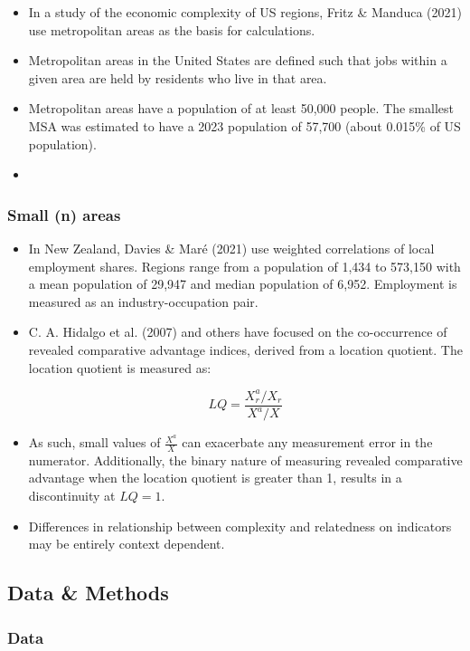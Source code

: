\documentclass[
]{agujournal2019}
\providecommand{\tightlist}{%
  \setlength{\itemsep}{0pt}\setlength{\parskip}{0pt}}\usepackage{longtable,booktabs,array}
\begin{document}
\begin{itemize}
\tightlist
\item
  In a study of the economic complexity of US regions, Fritz \& Manduca
  (2021) use metropolitan areas as the basis for calculations.
\item
  Metropolitan areas in the United States are defined such that jobs
  within a given area are held by residents who live in that area.
\item
  Metropolitan areas have a population of at least 50,000 people. The
  smallest MSA was estimated to have a 2023 population of 57,700 (about
  0.015\% of US population).
\item
\end{itemize}

\subsubsection{Small (n) areas}\label{small-n-areas}

\begin{itemize}
\item
  In New Zealand, Davies \& Maré (2021) use weighted correlations of
  local employment shares. Regions range from a population of 1,434 to
  573,150 with a mean population of 29,947 and median population of
  6,952. Employment is measured as an industry-occupation pair.
\item
  C. A. Hidalgo et al. (2007) and others have focused on the
  co-occurrence of revealed comparative advantage indices, derived from
  a location quotient. The location quotient is measured as:

  \[
  LQ = \frac{X_r^a/X_r}{X^a/X}
  \]
\item
  As such, small values of \(\frac{X^a}{X}\) can exacerbate any
  measurement error in the numerator. Additionally, the binary nature of
  measuring revealed comparative advantage when the location quotient is
  greater than 1, results in a discontinuity at \(LQ = 1\).
\item
  Differences in relationship between complexity and relatedness on
  indicators may be entirely context dependent.
\end{itemize}

\subsection{Data \& Methods}\label{sec-data-methods}

\subsubsection{Data}\label{data}
\end{document}
